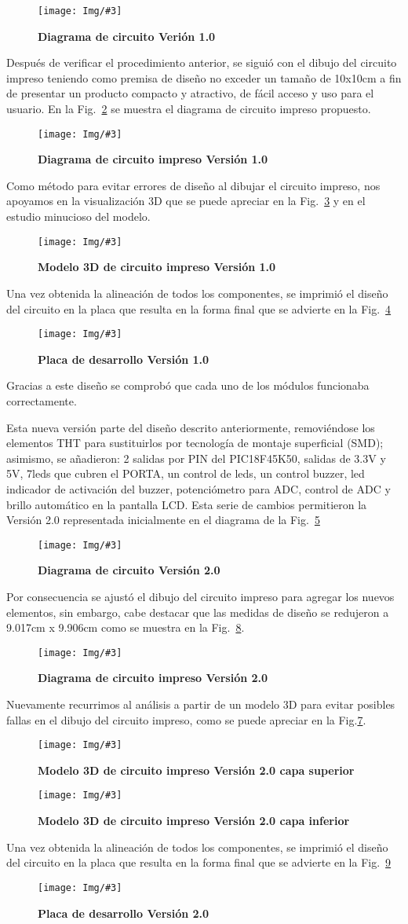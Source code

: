 \documentclass[times, 10pt,twocolumn]{article}
\newcommand{\Img}[5]{
   \begin{figure}[H]
   	   \centering
       \texttt{[image: Img/\#3]}
       \caption{ \centering \textbf{\small #4}}
       \label{#5}
       \end{figure}
   }
\begin{document}
\Img{8.5cm}{6.3cm}{Primera_Version.pdf}{Diagrama de circuito Verión 1.0}{fig:1} Después de verificar el procedimiento anterior, se siguió con el dibujo del circuito impreso teniendo como premisa de diseño no exceder un tamaño de 10x10cm a fin de presentar un producto compacto y atractivo, de fácil acceso y uso para el usuario.
En la Fig.~\ref{fig:2} se muestra el diagrama de circuito impreso propuesto.
\Img{6.5cm}{6.0cm}{primera_version_pcb}{Diagrama de circuito impreso Versión 1.0}{fig:2}
Como método para evitar errores de diseño al dibujar el circuito impreso, nos apoyamos en la visualización 3D que se puede apreciar en la Fig.~\ref{fig:3} y en el estudio minucioso del modelo.
\Img{8.5cm}{7.0cm}{primera_version_3d}{Modelo 3D de circuito impreso Versión 1.0}{fig:3}
Una vez obtenida la alineación de todos los componentes, se imprimió el diseño del circuito en la placa que resulta en la forma final que se advierte en la Fig.~\ref{fig:4}
\Img{8.5cm}{7.0cm}{primera_version_final}{Placa de desarrollo Versión 1.0}{fig:4} 
Gracias a este diseño se comprobó que cada uno de los módulos funcionaba correctamente. 


Esta nueva versión parte del diseño descrito anteriormente, removiéndose los elementos THT para sustituirlos por tecnología de montaje superficial (SMD); asimismo, se añadieron: 2 salidas por PIN del PIC18F45K50, salidas de 3.3V y 5V, 7leds que cubren el PORTA, un control de leds, un control buzzer, led indicador de activación del buzzer, potenciómetro para ADC, control de ADC y brillo automático en la pantalla LCD. Esta serie de cambios permitieron la Versión 2.0 representada inicialmente en el diagrama de la Fig.~\ref{fig:5}
\Img{8.0cm}{5.5cm}{Segunda_Version}{Diagrama de circuito Versión 2.0}{fig:5}

Por consecuencia se ajustó el dibujo del circuito impreso para agregar los nuevos elementos, sin embargo, cabe destacar que las medidas de diseño se redujeron a 9.017cm x 9.906cm como se muestra en la Fig.~\ref{fig:6}. 
\Img{6.5cm}{6.0cm}{segunda_version_pcb}{Diagrama de circuito impreso Versión 2.0}{fig:6}


Nuevamente recurrimos al análisis a partir de un modelo 3D para evitar posibles fallas en el dibujo del circuito impreso, como se puede apreciar en la Fig.\ref{fig:7}.
\Img{7.2cm}{6.2cm}{segunda_version_3d}{Modelo 3D de circuito impreso Versión 2.0 capa superior}{fig:7}
\Img{7.2cm}{6.2cm}{segunda_version_pcb_b}{Modelo 3D de circuito impreso Versión 2.0 capa inferior}{fig:6}
Una vez obtenida la alineación de todos los componentes, se imprimió el diseño del circuito en la placa que resulta en la forma final que se advierte en la Fig.~\ref{fig:8}
\Img{7.5cm}{7.0cm}{segunda_version_final}{Placa de desarrollo Versión 2.0}{fig:8}
\end{document}
